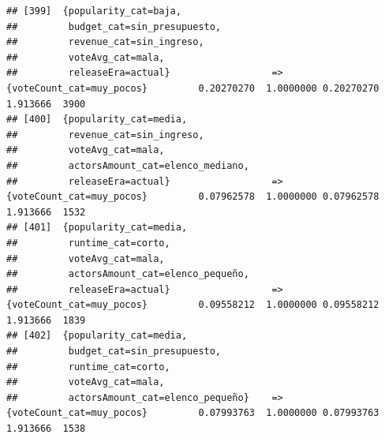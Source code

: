 \documentclass[
]{article}
\begin{document}
\begin{verbatim}
## [399]  {popularity_cat=baja,                                                                                                    
##         budget_cat=sin_presupuesto,                                                                                             
##         revenue_cat=sin_ingreso,                                                                                                
##         voteAvg_cat=mala,                                                                                                       
##         releaseEra=actual}                  => {voteCount_cat=muy_pocos}         0.20270270  1.0000000 0.20270270 1.913666  3900
## [400]  {popularity_cat=media,                                                                                                   
##         revenue_cat=sin_ingreso,                                                                                                
##         voteAvg_cat=mala,                                                                                                       
##         actorsAmount_cat=elenco_mediano,                                                                                        
##         releaseEra=actual}                  => {voteCount_cat=muy_pocos}         0.07962578  1.0000000 0.07962578 1.913666  1532
## [401]  {popularity_cat=media,                                                                                                   
##         runtime_cat=corto,                                                                                                      
##         voteAvg_cat=mala,                                                                                                       
##         actorsAmount_cat=elenco_pequeño,                                                                                        
##         releaseEra=actual}                  => {voteCount_cat=muy_pocos}         0.09558212  1.0000000 0.09558212 1.913666  1839
## [402]  {popularity_cat=media,                                                                                                   
##         budget_cat=sin_presupuesto,                                                                                             
##         runtime_cat=corto,                                                                                                      
##         voteAvg_cat=mala,                                                                                                       
##         actorsAmount_cat=elenco_pequeño}    => {voteCount_cat=muy_pocos}         0.07993763  1.0000000 0.07993763 1.913666  1538

\end{verbatim}
\end{document}
